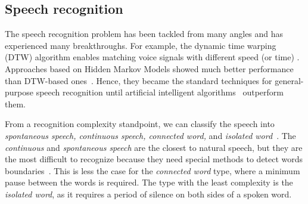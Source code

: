 \subsection{Speech recognition}

The speech recognition problem has been tackled from many angles and has experienced many breakthroughs. For example, the dynamic time warping (DTW) algorithm enables matching voice signals with different speed (or time) \cite{vintsyuk1968speech}. 
Approaches based on Hidden Markov Models showed much better performance than DTW-based ones~\cite{jelinek1997statistical}. Hence, they became the standard techniques for general-purpose speech recognition until artificial intelligent algorithms~\cite{hinton2012deep} outperform them. 

From a recognition complexity standpoint, we can classify the speech into \textit{spontaneous speech, continuous speech, connected word,} and \textit{isolated word}~\cite{gaikwad2010review}.
The \textit{continuous} and \textit{spontaneous speech} are the closest to natural speech, but they are the most difficult to recognize because they need special methods to detect words boundaries~\cite{gaikwad2010review}. This is less the case for the \textit{connected word} type, where a minimum pause between the words is required. The type with the least complexity is the \textit{isolated word}, as it requires a period of silence on both sides of a spoken word. 
 
